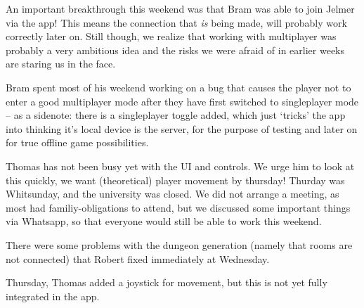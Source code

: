 \documentclass[../main.tex]{subfiles}
\begin{document}
An important breakthrough this weekend was that Bram was able to join Jelmer via the app! This means the connection that \textit{is} being made, will probably work correctly later on. Still though, we realize that working with multiplayer was probably a very ambitious idea and the risks we were afraid of in earlier weeks are staring us in the face.

Bram spent most of his weekend working on a bug that causes the player not to enter a good multiplayer mode after they have first switched to singleplayer mode -- as a sidenote: there is a singleplayer toggle added, which just `tricks' the app into thinking it's local device is the server, for the purpose of testing and later on for true offline game possibilities.

Thomas has not been busy yet with the UI and controls. We urge him to look at this quickly, we want (theoretical) player movement by thursday!
\bigbreak\noindent
Thurday was Whitsunday, and the university was closed. We did not arrange a meeting, as most had familiy-obligations to attend, but we discussed some important things via Whatsapp, so that everyone would still be able to work this weekend.

There were some problems with the dungeon generation (namely that rooms are not connected) that Robert fixed immediately at Wednesday.

Thursday, Thomas added a joystick for movement, but this is not yet fully integrated in the app.
\end{document}
